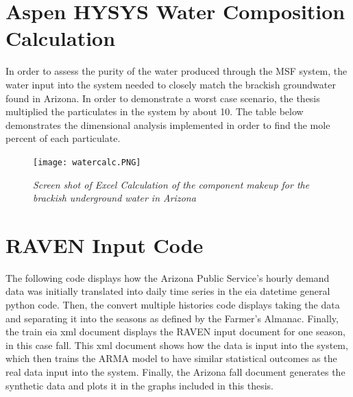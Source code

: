 \documentclass[12pt]{UIdahoMastersThesis}
\begin{document}
\newpage

\chapter{Aspen HYSYS Water Composition Calculation}
In order to assess the purity of the water produced through the MSF system, the water input into the system needed to closely match the brackish groundwater found in Arizona.  In order to demonstrate a worst case scenario, the thesis multiplied the particulates in the system by about 10.  The table below demonstrates the dimensional analysis implemented in order to find the mole percent of each particulate.

\begin{figure}
\centering
\texttt{[image: watercalc.PNG]}
\caption{\small \sl Screen shot of Excel Calculation of the component makeup for the brackish underground water in Arizona}
\end{figure}


% 

\chapter{RAVEN Input Code}
The following code displays how the Arizona Public Service's hourly demand data was initially translated into daily time series in the eia datetime general python code.  Then, the convert multiple histories code displays taking the data and separating it into the seasons as defined by the Farmer's Almanac.  Finally, the train eia xml document displays the RAVEN input document for one season, in this case fall.  This xml document shows how the data is input into the system, which then trains the ARMA model to have similar statistical outcomes as the real data input into the system.  Finally, the Arizona fall document generates the synthetic data and plots it in the graphs included in this thesis.









\end{document}
